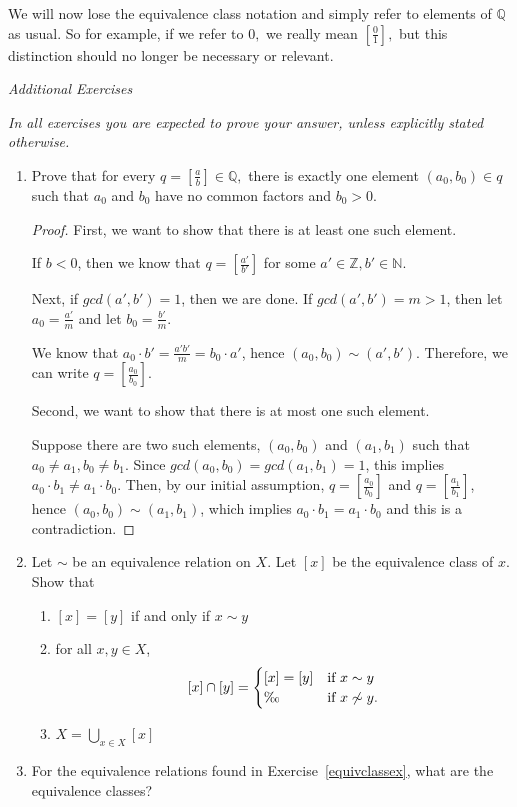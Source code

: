 \documentclass[11pt]{article}
\newcommand{\bbQ}{\mathbb{Q}}
\renewcommand{\emptyset}{\O}
\renewcommand{\_}[1]{\underline{ #1 }}
\theoremstyle{definition}
\newcommand{\N}{\mathbb{N}}
\newcommand{\Z}{\mathbb{Z}}
\newcommand{\Q}{\mathbb Q}
\numberwithin{equation}{subsection}
\begin{document}
We will now lose the equivalence class notation and simply refer to elements of $\Q$ as usual. So for example, if we refer to $0,$ we really mean $[
\frac{0}{1}],$ but this distinction should no longer be necessary or relevant.
\bigskip

\begin{center}
{\em Additional Exercises}
\end{center}

{\em In all exercises you are expected to prove your answer, unless explicitly stated otherwise.}


\begin{enumerate}

\item
Prove that for every $q=\left[\frac{a}{b}\right]\in\bbQ,$ there is exactly one element $(a_0,b_0)\in q$ such that $a_0$ and $b_0$ have no common factors and $b_0>0$.


\begin{proof}
First, we want to show that there is at least one such element. 

If $b<0$, then we know that $q=[\frac{a'}{b'}]$ for some $a' \in \Z, b' \in \N$.

Next, if $gcd(a',b')=1$, then we are done. If $gcd(a',b')=m>1$, then let $a_0 = \frac{a'}{m}$ and let $b_0 = \frac{b'}{m}$.

We know that $a_0 \cdot b' = \frac{a'b'}{m} = b_0 \cdot a'$, hence $(a_0,b_0) \sim (a',b')$. Therefore, we can write $q=[\frac{a_0}{b_0}]$.

Second, we want to show that there is at most one such element.

Suppose there are two such elements, $(a_0,b_0)$ and $(a_1,b_1)$ such that $a_0 \not = a_1, b_0 \not = b_1$. Since $gcd(a_0,b_0)=gcd(a_1,b_1)=1$, this implies $a_0 \cdot b_1 \not = a_1 \cdot b_0$. Then, by our initial assumption, $q = [\frac{a_0}{b_0}]$ and $q = [\frac{a_1}{b_1}]$, hence $(a_0,b_0) \sim (a_1,b_1)$, which implies $a_0 \cdot b_1 = a_1 \cdot b_0$ and this is a contradiction.

\renewcommand\qedsymbol{QED}
\end{proof}



\item Let $\sim$ be an equivalence relation on $X$. Let $[x]$ be the equivalence class of $x$. Show that
\begin{enumerate}
\item $[x] = [y]$ if and only if $x\sim y$
\item for all $x, y \in X$,
\[[x] \cap [y] = \begin{cases} [x] =[y] & \text{if $x \sim y$} \\
\emptyset & \text{if $x \not\sim y $}.
\end{cases}\]
\item $X = \displaystyle \bigcup_{x \in X}[x]$
\end{enumerate}
    
    


\item For the equivalence relations found in Exercise~\ref{equivclassex}, what are the equivalence classes?


\end{enumerate}
\end{document}
